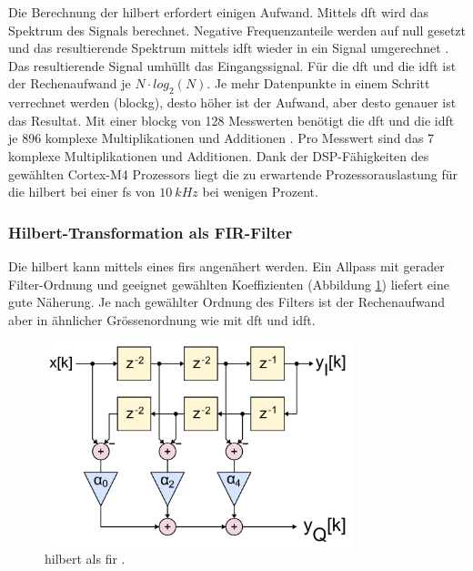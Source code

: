 Die Berechnung der \gls{hilbert} erfordert einigen Aufwand. Mittels \gls{dft} wird das Spektrum des Signals berechnet. Negative Frequenzanteile werden auf null gesetzt und das resultierende Spektrum mittels \gls{idft} wieder in ein Signal umgerechnet \cite{wiki_hilbert}. Das resultierende Signal umhüllt das Eingangssignal. 
Für die \gls{dft} und die \gls{idft} ist der Rechenaufwand je \ensuremath{N \cdot log_2(N)}. Je mehr Datenpunkte in einem Schritt verrechnet werden (\gls{blockg}), desto höher ist der Aufwand, aber desto genauer ist das Resultat. Mit einer \gls{blockg} von 128 Messwerten benötigt die \gls{dft} und die \gls{idft} je 896 komplexe Multiplikationen und Additionen \cite[Kap. 3, S. 48]{dsv1_hilbert}. Pro Messwert sind das 7 komplexe Multiplikationen und Additionen. Dank der DSP-Fähigkeiten des gewählten Cortex\texttrademark -M4 Prozessors liegt die zu erwartende Prozessorauslastung für die \gls{hilbert} bei einer \gls{fs} von \ensuremath{10~kHz} bei wenigen Prozent.

\subsubsection{Hilbert-Transformation als FIR-Filter}
Die \gls{hilbert} kann mittels eines \gls{fir}s angenähert werden. Ein Allpass mit gerader Filter-Ordnung und geeignet gewählten Koeffizienten (Abbildung \ref{fig.hilbertFIR}) liefert eine gute Näherung. Je nach gewählter Ordnung des Filters ist der Rechenaufwand aber in ähnlicher Grössenordnung wie mit \gls{dft} und \gls{idft}.
\begin{figure}[H]
	\centering
		\includegraphics[width=0.8\textwidth]{images/FIR_Hilbert_Transform_Filter.png}
	\caption{\gls{hilbert} als \gls{fir} \cite{wiki_hilbertFIR}.}
	\label{fig.hilbertFIR}
\end{figure}

